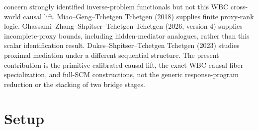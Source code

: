 \documentclass{article}
\begin{document}
concern strongly identified inverse-problem functionals but not this WBC cross-world causal lift. Miao--Geng--Tchetgen Tchetgen (2018) supplies finite proxy-rank logic. Ghassami--Zhang--Shpitser--Tchetgen Tchetgen (2026, version 4) supplies incomplete-proxy bounds, including hidden-mediator analogues, rather than this scalar identification result. Dukes--Shpitser--Tchetgen Tchetgen (2023) studies proximal mediation under a different sequential structure. The present contribution is the primitive calibrated causal lift, the exact WBC causal-fiber specialization, and full-SCM constructions, not the generic response-program reduction or the stacking of two bridge stages.

\section{Setup}
\end{document}
